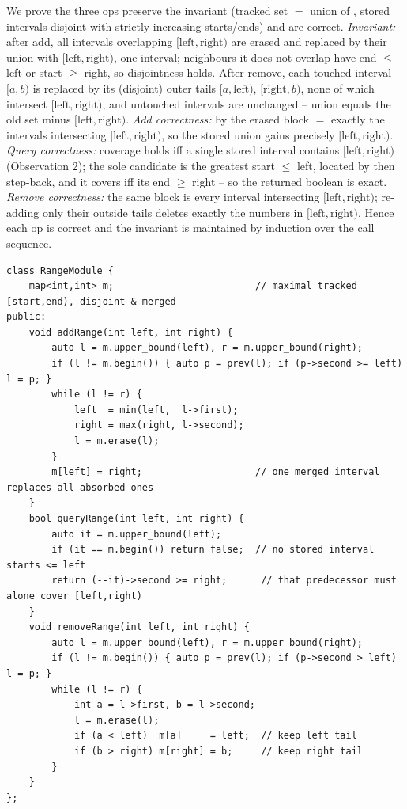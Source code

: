 \begin{proofbox}
We prove the three ops preserve the invariant (tracked set $=$ union of , stored intervals
disjoint with strictly increasing starts/ends) and are correct.
\emph{Invariant:} after add, all intervals overlapping $[\text{left},\text{right})$ are erased and
replaced by their union with $[\text{left},\text{right})$, one interval; neighbours it does not overlap
have end $\le$ left or start $\ge$ right, so disjointness holds. After remove, each touched interval
$[a,b)$ is replaced by its (disjoint) outer tails $[a,\text{left})$, $[\text{right},b)$, none of which
intersect $[\text{left},\text{right})$, and untouched intervals are unchanged -- union equals the old
set minus $[\text{left},\text{right})$. \emph{Add correctness:} by  the erased
block $=$ exactly the intervals intersecting $[\text{left},\text{right})$, so the stored union gains
precisely $[\text{left},\text{right})$. \emph{Query correctness:} coverage holds iff a single stored
interval contains $[\text{left},\text{right})$ (Observation 2); the sole candidate is the greatest
start $\le$ left, located by  then step-back, and it covers iff its end
$\ge$ right -- so the returned boolean is exact. \emph{Remove correctness:} the same block is every
interval intersecting $[\text{left},\text{right})$; re-adding only their outside tails deletes exactly
the numbers in $[\text{left},\text{right})$. Hence each op is correct and the invariant is maintained
by induction over the call sequence. \end{proofbox}

\begin{lstlisting}[caption={Range Module -- submittable ordered-map interval manager (LeetCode 715)}, label={lst:c05-range-soln}]
class RangeModule {
    map<int,int> m;                         // maximal tracked [start,end), disjoint & merged
public:
    void addRange(int left, int right) {
        auto l = m.upper_bound(left), r = m.upper_bound(right);
        if (l != m.begin()) { auto p = prev(l); if (p->second >= left) l = p; }
        while (l != r) {
            left  = min(left,  l->first);
            right = max(right, l->second);
            l = m.erase(l);
        }
        m[left] = right;                    // one merged interval replaces all absorbed ones
    }
    bool queryRange(int left, int right) {
        auto it = m.upper_bound(left);
        if (it == m.begin()) return false;  // no stored interval starts <= left
        return (--it)->second >= right;      // that predecessor must alone cover [left,right)
    }
    void removeRange(int left, int right) {
        auto l = m.upper_bound(left), r = m.upper_bound(right);
        if (l != m.begin()) { auto p = prev(l); if (p->second > left) l = p; }
        while (l != r) {
            int a = l->first, b = l->second;
            l = m.erase(l);
            if (a < left)  m[a]     = left;  // keep left tail
            if (b > right) m[right] = b;     // keep right tail
        }
    }
};
\end{lstlisting}

